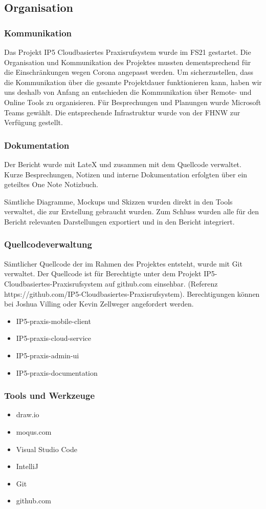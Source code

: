 \subsection{Organisation}\label{subsec:organisation}

\subsubsection*{Kommunikation}

Das Projekt IP5 Cloudbasiertes Praxisrufsystem wurde im FS21 gestartet. Die Organisation und Kommunikation des Projektes mussten dementsprechend für die Einschränkungen wegen Corona angepasst werden.
Um sicherzustellen, dass die Kommunikation über die gesamte Projektdauer funktionieren kann, haben wir uns deshalb von Anfang an entschieden die Kommunikation über Remote- und Online Tools zu organisieren.
Für Besprechungen und Planungen wurde Microsoft Teams gewählt. Die entsprechende Infrastruktur wurde von der FHNW zur Verfügung gestellt.

\subsubsection*{Dokumentation}

Der Bericht wurde mit LateX und zusammen mit dem Quellcode verwaltet. Kurze Besprechungen, Notizen und interne Dokumentation erfolgten über ein geteiltes One Note Notizbuch.

Sämtliche Diagramme, Mockups und Skizzen wurden direkt in den Tools verwaltet, die zur Erstellung gebraucht wurden. Zum Schluss wurden alle für den Bericht relevanten Darstellungen exportiert und in den Bericht integriert.

\subsubsection*{Quellcodeverwaltung}

Sämtlicher Quellcode der im Rahmen des Projektes entsteht, wurde mit Git verwaltet. Der Quellcode ist für Berechtigte unter dem Projekt IP5-Cloudbasiertes-Praxisrufsystem auf github.com einsehbar.
(Referenz https://github.com/IP5-Cloudbasiertes-Praxisrufsystem). Berechtigungen können bei Joshua Villing oder Kevin Zellweger angefordert werden.

\begin{itemize}
    \item IP5-praxis-mobile-client
    \item IP5-praxis-cloud-service
    \item IP5-praxis-admin-ui
    \item IP5-praxis-documentation
\end{itemize}

\subsubsection*{Tools und Werkzeuge}

\begin{itemize}
    \item draw.io
    \item moqus.com
    \item Visual Studio Code
    \item IntelliJ
    \item Git
    \item github.com
\end{itemize}
